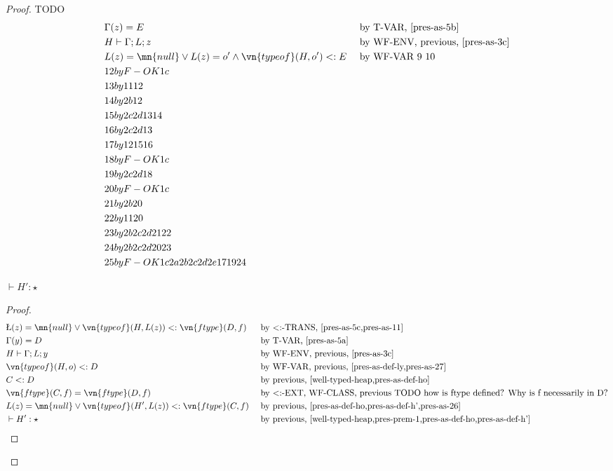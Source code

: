 \begin{proof}
TODO
\begin{alignat}{3}
    &\Gamma(z) = E
        && \text{ by T-VAR, \cref{pres-as-5b}}\\
    &H \vdash \Gamma; L; z
        && \text{ by WF-ENV, previous, \cref{pres-as-3c}}\\
    &L(z) = \mn{null} \vee L(z) = o' \wedge \vn{typeof}(H, o') <: E \label{pres-as-11}
        && \text{ by WF-VAR 9 10}\\
    &12 by F-OK 1c\\
    &13 by 11 12\\
    &14 by 2b 12\\
    &15 by 2c 2d 13 14\\
    &16 by 2c 2d 13\\
    &17 by 12 15 16\\
    &18 by F-OK 1c\\
    &19 by 2c 2d 18\\
    &20 by F-OK 1c\\
    &21 by 2b 20\\
    &22 by 11 20\\
    &23 by 2b 2c 2d 21 22\\
    &24 by 2b 2c 2d 20 23\\
    &25 by F-OK 1c 2a 2b 2c 2d 2e 17 19 24\\
\end{alignat}

$\vdash H' : \star$
\begin{proof}
\begin{alignat}{3}
    &\L(z) = \mn{null} \vee \vn{typeof}(H, L(z)) <: \vn{ftype}(D, f) \label{pres-as-26}
        && \text{ by <:-TRANS, \cref{pres-as-5c,pres-as-11}}\\
    &\Gamma(y) = D \label{pres-as-27}
        && \text{ by T-VAR, \cref{pres-as-5a}} \\
    &H \vdash \Gamma; L; y
        && \text{ by WF-ENV, previous, \cref{pres-as-3c}}\\
    &\vn{typeof}(H, o) <: D
        && \text{ by WF-VAR, previous, \cref{pres-as-def-ly,pres-as-27}}\\
    &C <: D
        && \text{ by previous, \cref{well-typed-heap,pres-as-def-ho}}\\
    &\vn{ftype}(C, f) = \vn{ftype}(D, f) 
        && \text{ by <:-EXT, WF-CLASS, previous TODO how is ftype defined? Why is f necessarily in D?}\\
    &L(z) = \mn{null} \vee \vn{typeof}(H', L(z)) <: \vn{ftype}(C, f)
        && \text{ by previous, \cref{pres-as-def-ho,pres-as-def-h',pres-as-26}}\\
    &\vdash H' : \star
        && \text{ by previous, \cref{well-typed-heap,pres-prem-1,pres-as-def-ho,pres-as-def-h'}}
\end{alignat}
\end{proof}


\end{proof}
